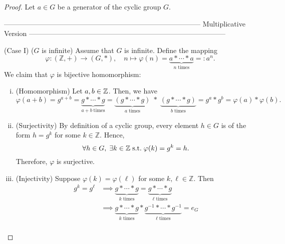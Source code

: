 \documentclass[11pt,openany]{article}
\begin{document}
\newpage
{}
\begin{proof}
	Let \( a \in G \) be a generator of the cyclic group \(G\). \\
	\begin{center}
	\ttfamily ------------------------------------------------------------------------------------ Multiplicative Version ------------------------------------------------------------------------------------
	\end{center}
	(Case I) ($G$ is infinite) Assume that $G$ is infinite.
		Define the mapping \[
	\varphi : (\mathbb{Z}, +) \to (G, \ast),\quad n\mapsto \varphi(n) = \underbrace{a\ast\cdots\ast a}_{n\; \text{times}}=:a^n.
	\] We claim that $\varphi$ is bijective homomorphism: \begin{enumerate}[(i)]
		\item (Homomorphism)\;  Let $a,b\in\mathbb{Z}$. Then, we have \[
		\varphi(a+b)=g^{a+b}=\underbrace{g\ast\cdots\ast g}_{a+b\; \text{times}}=\underbrace{(g\ast\cdots\ast g)}_{a\; \text{times}}\;\ast\;\underbrace{(g\ast\cdots\ast g)}_{b\; \text{times}}=g^a\ast g^b = \varphi(a)\ast\varphi(b).
		\]
		\item (Surjectivity)\; By definition of a cyclic group, every element \(h\in G\) is of the form \(h=g^k\) for some \(k\in \mathbb{Z}\). Hence, \[
		\forall h\in G,\; \exists k\in\mathbb{Z}\; \text{s.t.}\; \varphi(k)=g^k = h.
		\] Therefore, \(\varphi\) is surjective.
		\item (Injectivity)\; Suppose \(\varphi(k)=\varphi(\ell)\) for some \(k,\ell\in \mathbb{Z}\). Then \begin{align*}
			g^k=g^\ell&\implies \underbrace{g\ast\cdots\ast g}_{k\; \text{times}}=\underbrace{g\ast\cdots\ast g}_{\ell\; \text{times}}\\
			&\implies \underbrace{g\ast\cdots\ast g}_{k\; \text{times}}\ast \underbrace{g^{-1}\ast\cdots\ast g^{-1}}_{\ell\; \text{times}}=e_G \\

\end{align*}
\end{enumerate}
\end{proof}
\end{document}
